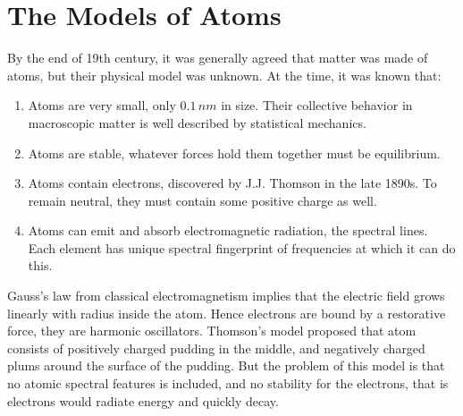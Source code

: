 \documentclass[11pt]{article}
\theoremstyle{break}
\theoremstyle{break}
\begin{document}
\newpage
\section{The Models of Atoms}
By the end of 19th century, it was generally agreed that matter was made of atoms, but their physical model was unknown. At the time, it was known that:
\begin{enumerate}
\item Atoms are very small, only $0.1\,nm$ in size. Their collective behavior in macroscopic matter is well described by statistical mechanics.
\item Atoms are stable, whatever forces hold them together must be equilibrium.
\item Atoms contain electrons, discovered by J.J. Thomson in the late 1890s. To remain neutral, they must contain some positive charge as well.
\item Atoms can emit and absorb electromagnetic radiation, the spectral lines. Each element has unique spectral fingerprint of frequencies at which it can do this.
\end{enumerate}

Gauss's law from classical electromagnetism implies that the electric field grows linearly with radius inside the atom. Hence electrons are bound by a restorative force, they are harmonic oscillators. Thomson's model proposed that atom consists of positively charged pudding in the middle, and negatively charged plums around the surface of the pudding. But the problem of this model is that no atomic spectral features is included, and no stability for the electrons, that is electrons would radiate energy and quickly decay.\\
\end{document}
